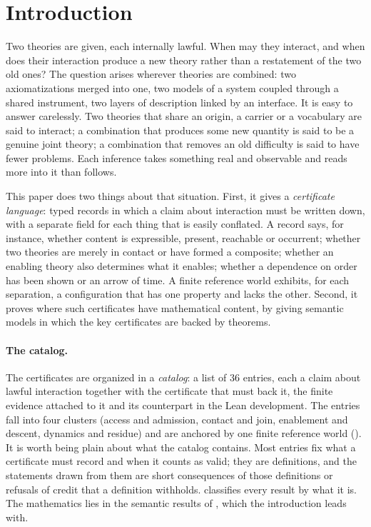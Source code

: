 \section{Introduction}
\label{sec:intro}

Two theories are given, each internally lawful. When may they interact, and when does
their interaction produce a new theory rather than a restatement of the two old ones?
The question arises wherever theories are combined: two axiomatizations merged into one,
two models of a system coupled through a shared instrument, two layers of description
linked by an interface. It is easy to answer carelessly. Two theories that share an
origin, a carrier or a vocabulary are said to interact; a combination that produces some
new quantity is said to be a genuine joint theory; a combination that removes an old
difficulty is said to have fewer problems. Each inference takes something real and
observable and reads more into it than follows.

This paper does two things about that situation. First, it gives a \emph{certificate
language}: typed records in which a claim about interaction must be written down, with a
separate field for each thing that is easily conflated. A record says, for instance,
whether content is expressible, present, reachable or occurrent; whether two theories are
merely in contact or have formed a composite; whether an enabling theory also determines
what it enables; whether a dependence on order has been shown or an arrow of time. A
finite reference world exhibits, for each separation, a configuration that has one
property and lacks the other. Second, it proves where such certificates have mathematical
content, by giving semantic models in which the key certificates are backed by theorems.

\paragraph{The catalog.} The certificates are organized in a \emph{catalog}: a list of 36
entries, each a claim about lawful interaction together with the certificate that must
back it, the finite evidence attached to it and its counterpart in the Lean development.
The entries fall into four clusters (access and admission, contact and join, enablement
and descent, dynamics and residue) and are anchored by one finite reference world
(). It is worth being plain about what the catalog contains. Most entries
fix what a certificate must record and when it counts as valid; they are definitions, and
the statements drawn from them are short consequences of those definitions or refusals of
credit that a definition withholds.  classifies every result by what it
is. The mathematics lies in the semantic results of
, which the introduction leads with.

